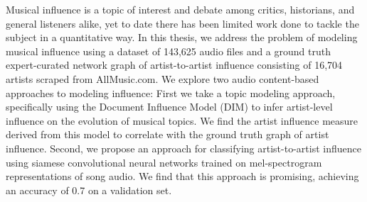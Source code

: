 Musical influence is a topic of interest and debate among critics, historians, and general listeners alike, yet to date there has been limited work done to tackle the subject in a quantitative way. In this thesis, we address the problem of modeling musical influence using a dataset of 143,625 audio files and a ground truth expert-curated network graph of artist-to-artist influence consisting of 16,704 artists scraped from AllMusic.com. We explore two audio content-based approaches to modeling influence: First we take a topic modeling approach, specifically using the Document Influence Model (DIM) to infer artist-level influence on the evolution of musical topics. We find the artist influence measure derived from this model to correlate with the ground truth graph of artist influence. Second, we propose an approach for classifying artist-to-artist influence using siamese convolutional neural networks trained on mel-spectrogram representations of song audio. We find that this approach is promising, achieving an accuracy of 0.7 on a validation set.
